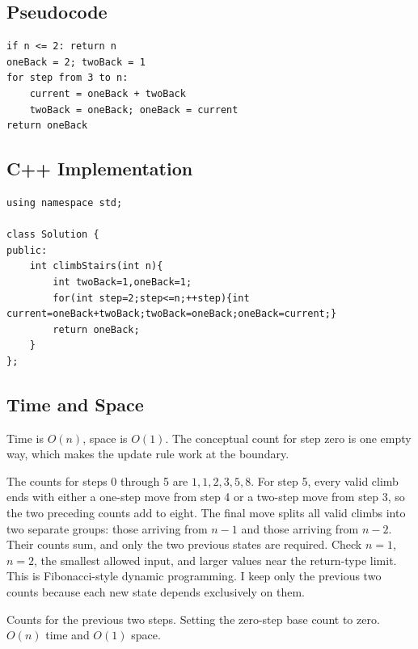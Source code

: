 \subsection{Pseudocode}
\begin{lstlisting}[style=pseudocode]
if n <= 2: return n
oneBack = 2; twoBack = 1
for step from 3 to n:
    current = oneBack + twoBack
    twoBack = oneBack; oneBack = current
return oneBack
\end{lstlisting}

\subsection{C++ Implementation}
\begin{lstlisting}[style=compactcode,caption={Complete C++ solution: Climbing Stairs}]
using namespace std;

class Solution {
public:
    int climbStairs(int n){
        int twoBack=1,oneBack=1;
        for(int step=2;step<=n;++step){int current=oneBack+twoBack;twoBack=oneBack;oneBack=current;}
        return oneBack;
    }
};
\end{lstlisting}

\subsection{Time and Space}
Time is \(O(n)\), space is \(O(1)\). The conceptual count for step zero is one
empty way, which makes the update rule work at the boundary.

\lessonexpansion
  {The counts for steps 0 through 5 are \(1,1,2,3,5,8\). For step 5, every
   valid climb ends with either a one-step move from step 4 or a two-step move
   from step 3, so the two preceding counts add to eight.}
  {The final move splits all valid climbs into two separate groups: those
   arriving from \(n-1\) and those arriving from \(n-2\). Their counts sum,
   and only the two previous states are required.}
  {Check \(n=1\), \(n=2\), the smallest allowed input, and larger values near
   the return-type limit.}
  {This is Fibonacci-style dynamic programming. I keep only the previous two
   counts because each new state depends exclusively on them.}

  {Counts for the previous two steps.}
  {Setting the zero-step base count to zero.}{$O(n)$ time and $O(1)$ space.}



